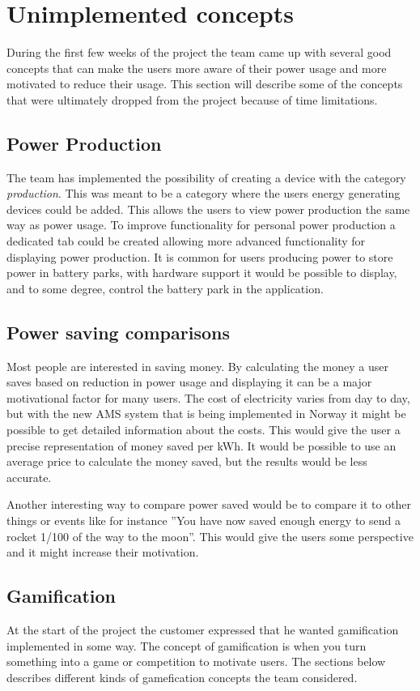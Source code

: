 \section{Unimplemented concepts}
During the first few weeks of the project the team came up with several good concepts that can make the users more aware of their power usage and more motivated to reduce their usage. This section will describe some of the concepts that were ultimately dropped from the project because of time limitations.

\subsection{Power Production}
The team has implemented the possibility of creating a device with the category \emph{production}. This was meant to be a category where the users energy generating devices could be added. This allows the users to view power production the same way as power usage. To improve functionality for personal power production a dedicated tab could be created allowing more advanced functionality for displaying power production.
It is common for users producing power to store power in battery parks, with hardware support it would be possible to display, and to some degree, control the battery park in the application.

\subsection{Power saving comparisons}
\label{sec:psc}
Most people are interested in saving money. By calculating the money a user saves based on reduction in power usage and displaying it can be a major motivational factor for many users. The cost of electricity varies from day to day, but with the new AMS\cite{ams} system that is being implemented in Norway it might be possible to get detailed information about the costs. This would give the user a precise representation of money saved per kWh. It would be possible to use an average price to calculate the money saved, but the results would be less accurate.

Another interesting way to compare power saved would be to compare it to other things or events like for instance ''You have now saved enough energy to send a rocket 1/100 of the way to the moon''. This would give the users some perspective and it might increase their motivation.

\subsection{Gamification}
At the start of the project the customer expressed that he wanted gamification implemented in some way. The concept of gamification is when you turn something into a game or competition to motivate users. The sections below describes different kinds of gamefication concepts the team considered.

